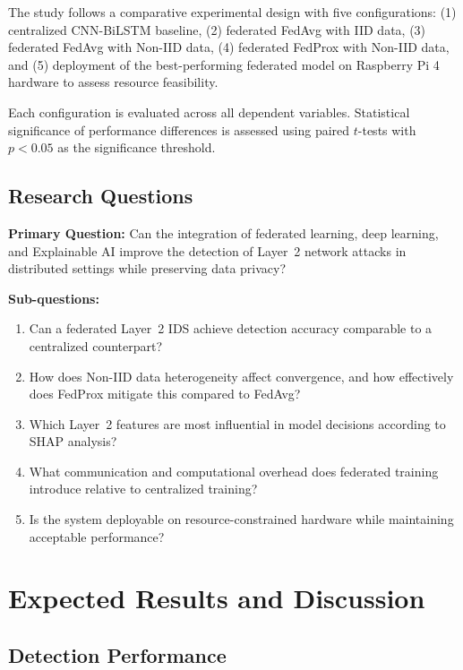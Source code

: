 \documentclass[conference]{IEEEtran}
\begin{document}
The study follows a comparative experimental design with five configurations:
(1) centralized CNN-BiLSTM baseline,
(2) federated FedAvg with IID data,
(3) federated FedAvg with Non-IID data,
(4) federated FedProx with Non-IID data, and
(5) deployment of the best-performing federated model on Raspberry Pi 4 hardware
to assess resource feasibility.

Each configuration is evaluated across all dependent variables. Statistical
significance of performance differences is assessed using paired $t$-tests with
$p < 0.05$ as the significance threshold.

\subsection{Research Questions}

\textbf{Primary Question:} Can the integration of federated learning, deep learning,
and Explainable AI improve the detection of Layer~2 network attacks in distributed
settings while preserving data privacy?

\textbf{Sub-questions:}
\begin{enumerate}
  \item Can a federated Layer~2 IDS achieve detection accuracy comparable to a
        centralized counterpart?
  \item How does Non-IID data heterogeneity affect convergence, and how effectively
        does FedProx mitigate this compared to FedAvg?
  \item Which Layer~2 features are most influential in model decisions according
        to SHAP analysis?
  \item What communication and computational overhead does federated training
        introduce relative to centralized training?
  \item Is the system deployable on resource-constrained hardware while maintaining
        acceptable performance?
\end{enumerate}

\section{Expected Results and Discussion}
\label{sec:results}

\subsection{Detection Performance}
\end{document}
